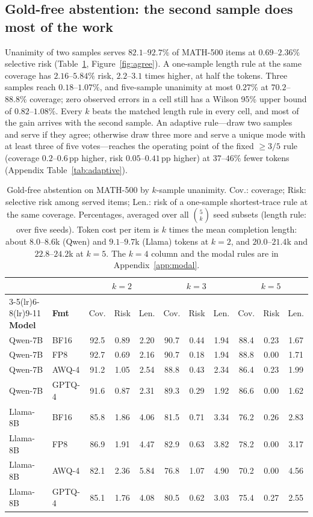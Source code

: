 \documentclass[11pt,a4paper]{article}
\begin{document}
\subsection{Gold-free abstention: the second sample does most of the work}
\label{sec:modal}
Unanimity of two samples serves $82.1$--$92.7\%$ of MATH-500 items at $0.69$--$2.36\%$ selective risk (Table~\ref{tab:agree}, Figure~\ref{fig:agree}). A one-sample length rule at the same coverage has $2.16$--$5.84\%$ risk, $2.2$--$3.1$ times higher, at half the tokens. Three samples reach $0.18$--$1.07\%$, and five-sample unanimity at most $0.27\%$ at $70.2$--$88.8\%$ coverage; zero observed errors in a cell still has a Wilson 95\% upper bound of $0.82$--$1.08\%$. Every $k$ beats the matched length rule in every cell, and most of the gain arrives with the second sample. An adaptive rule---draw two samples and serve if they agree; otherwise draw three more and serve a unique mode with at least three of five votes---reaches the operating point of the fixed $\ge3/5$ rule (coverage $0.2$--$0.6$\,pp higher, risk $0.05$--$0.41$\,pp higher) at $37$--$46\%$ fewer tokens (Appendix Table~\ref{tab:adaptive}).

\begin{table}[t]
\centering
\caption{Gold-free abstention on MATH-500 by $k$-sample unanimity. Cov.: coverage; Risk: selective risk among served items; Len.: risk of a one-sample shortest-trace rule at the same coverage. Percentages, averaged over all $\binom{5}{k}$ seed subsets (length rule: over five seeds). Token cost per item is $k$ times the mean completion length: about $8.0$--$8.6$k (Qwen) and $9.1$--$9.7$k (Llama) tokens at $k=2$, and $20.0$--$21.4$k and $22.8$--$24.2$k at $k=5$. The $k=4$ column and the modal rules are in Appendix~\ref{app:modal}.}
\label{tab:agree}
\small
\begin{tabular}{llccccccccc}
\toprule
 & & \multicolumn{3}{c}{$k=2$} & \multicolumn{3}{c}{$k=3$} & \multicolumn{3}{c}{$k=5$} \\
\cmidrule(lr){3-5}\cmidrule(lr){6-8}\cmidrule(lr){9-11}
\textbf{Model} & \textbf{Fmt} & Cov. & Risk & Len. & Cov. & Risk & Len. & Cov. & Risk & Len. \\
\midrule
Qwen-7B & BF16 & 92.5 & 0.89 & 2.20 & 90.7 & 0.44 & 1.94 & 88.4 & 0.23 & 1.67 \\
Qwen-7B & FP8 & 92.7 & 0.69 & 2.16 & 90.7 & 0.18 & 1.94 & 88.8 & 0.00 & 1.71 \\
Qwen-7B & AWQ-4 & 91.2 & 1.05 & 2.54 & 88.8 & 0.43 & 2.34 & 86.4 & 0.23 & 1.99 \\
Qwen-7B & GPTQ-4 & 91.6 & 0.87 & 2.31 & 89.3 & 0.29 & 1.92 & 86.6 & 0.00 & 1.62 \\
\midrule
Llama-8B & BF16 & 85.8 & 1.86 & 4.06 & 81.5 & 0.71 & 3.34 & 76.2 & 0.26 & 2.83 \\
Llama-8B & FP8 & 86.9 & 1.91 & 4.47 & 82.9 & 0.63 & 3.82 & 78.2 & 0.00 & 3.17 \\
Llama-8B & AWQ-4 & 82.1 & 2.36 & 5.84 & 76.8 & 1.07 & 4.90 & 70.2 & 0.00 & 4.56 \\
Llama-8B & GPTQ-4 & 85.1 & 1.76 & 4.08 & 80.5 & 0.62 & 3.03 & 75.4 & 0.27 & 2.55 \\
\bottomrule
\end{tabular}
\end{table}
\end{document}
